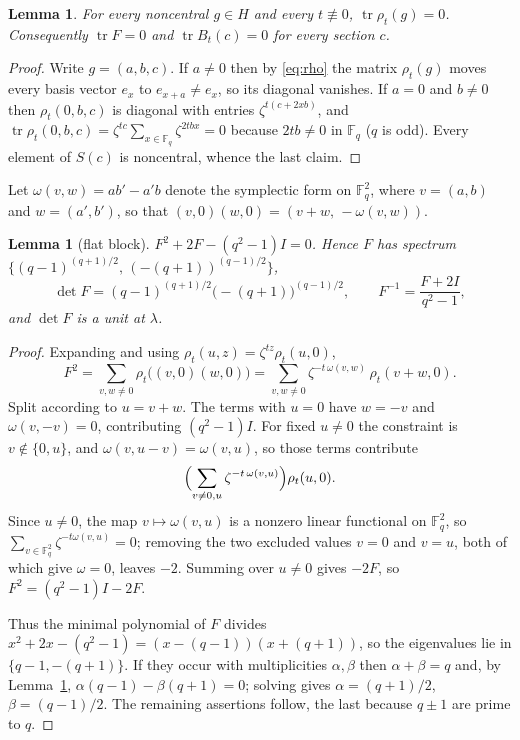 \documentclass[11pt]{article}
\theoremstyle{plain}
\newtheorem{lemma}[theorem]{Lemma}
\theoremstyle{definition}
\newcommand{\FF}{\mathbb F}
\newcommand{\tr}{\operatorname{tr}}
\begin{document}
\begin{lemma}\label{lem:trace}
For every noncentral $g\in H$ and every $t\not\equiv0$, $\tr\rho_t(g)=0$.
Consequently $\tr F=0$ and $\tr B_t(c)=0$ for every section $c$.
\end{lemma}

\begin{proof}
Write $g=(a,b,c)$. If $a\neq0$ then by \eqref{eq:rho} the matrix $\rho_t(g)$
moves every basis vector $e_x$ to $e_{x+a}\neq e_x$, so its diagonal vanishes.
If $a=0$ and $b\neq0$ then $\rho_t(0,b,c)$ is diagonal with entries
$\zeta^{t(c+2xb)}$, and
$\tr\rho_t(0,b,c)=\zeta^{tc}\sum_{x\in\FF_q}\zeta^{2tbx}=0$
because $2tb\neq0$ in $\FF_q$ ($q$ is odd). Every element of $S(c)$ is
noncentral, whence the last claim.
\end{proof}

Let $\omega(v,w)=ab'-a'b$ denote the symplectic form on $\FF_q^2$, where
$v=(a,b)$ and $w=(a',b')$, so that $(v,0)(w,0)=(v+w,\,-\omega(v,w))$.

\begin{lemma}[flat block]\label{lem:flat}
$F^2+2F-(q^2-1)I=0$. Hence $F$ has spectrum
$\{(q-1)^{(q+1)/2},\,(-(q+1))^{(q-1)/2}\}$,
\[
\det F=(q-1)^{(q+1)/2}\bigl(-(q+1)\bigr)^{(q-1)/2},
\qquad
F^{-1}=\frac{F+2I}{q^2-1},
\]
and $\det F$ is a unit at $\lambda$.
\end{lemma}

\begin{proof}
Expanding and using $\rho_t(u,z)=\zeta^{tz}\rho_t(u,0)$,
\[
F^2=\sum_{v,w\neq0}\rho_t\bigl((v,0)(w,0)\bigr)
    =\sum_{v,w\neq0}\zeta^{-t\,\omega(v,w)}\,\rho_t(v+w,0).
\]
Split according to $u=v+w$. The terms with $u=0$ have $w=-v$ and
$\omega(v,-v)=0$, contributing $(q^2-1)I$. For fixed $u\neq0$ the constraint is
$v\notin\{0,u\}$, and $\omega(v,u-v)=\omega(v,u)$, so those terms contribute
\[
\Bigl(\sum_{v\neq0,u}\zeta^{-t\,\omega(v,u)}\Bigr)\rho_t(u,0).
\]
Since $u\neq0$, the map $v\mapsto\omega(v,u)$ is a nonzero linear functional on
$\FF_q^2$, so $\sum_{v\in\FF_q^2}\zeta^{-t\omega(v,u)}=0$; removing the two
excluded values $v=0$ and $v=u$, both of which give $\omega=0$, leaves
$-2$. Summing over $u\neq0$ gives $-2F$, so $F^2=(q^2-1)I-2F$.

Thus the minimal polynomial of $F$ divides
$x^2+2x-(q^2-1)=(x-(q-1))(x+(q+1))$, so the eigenvalues lie in
$\{q-1,-(q+1)\}$. If they occur with multiplicities $\alpha,\beta$ then
$\alpha+\beta=q$ and, by Lemma~\ref{lem:trace},
$\alpha(q-1)-\beta(q+1)=0$; solving gives $\alpha=(q+1)/2$,
$\beta=(q-1)/2$. The remaining assertions follow, the last because $q\pm1$ are
prime to $q$.
\end{proof}
\end{document}
